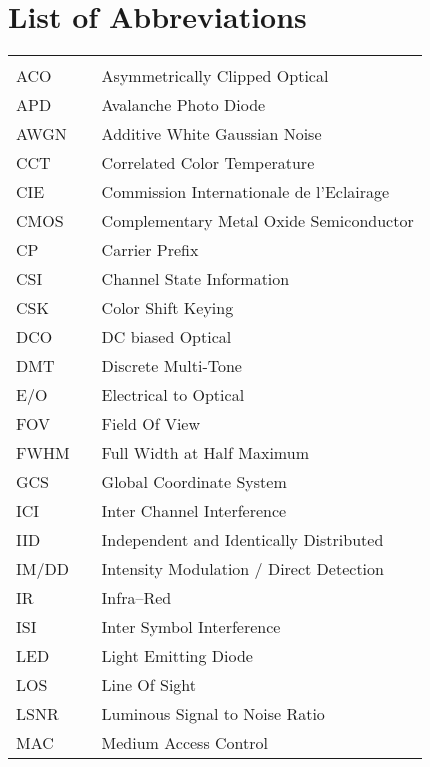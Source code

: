 \chapter*{List of Abbreviations}
\begin{center}
  \begin{longtable}{lll}
    \hspace*{2em} & \hspace*{1in} & \hspace*{4.5in} \\
    ACO & \dotfill & Asymmetrically Clipped Optical \\
		APD & \dotfill & Avalanche Photo Diode \\
		AWGN & \dotfill & Additive White Gaussian Noise \\
		CCT & \dotfill & Correlated Color Temperature \\
		CIE & \dotfill & Commission Internationale de l'Eclairage \\
		CMOS & \dotfill & Complementary Metal Oxide Semiconductor \\
		CP & \dotfill & Carrier Prefix \\
		CSI & \dotfill & Channel State Information \\
		CSK & \dotfill & Color Shift Keying \\
		DCO & \dotfill & DC biased Optical \\
		DMT & \dotfill & Discrete Multi-Tone \\
		E/O & \dotfill & Electrical to Optical \\
		FOV & \dotfill & Field Of View \\
		FWHM & \dotfill & Full Width at Half Maximum \\
		GCS & \dotfill & Global Coordinate System \\
		ICI & \dotfill & Inter Channel Interference \\
		IID & \dotfill & Independent and Identically Distributed \\
		IM/DD & \dotfill & Intensity Modulation / Direct Detection \\
		IR & \dotfill & Infra--Red \\
		ISI & \dotfill & Inter Symbol Interference \\
		LED & \dotfill & Light Emitting Diode \\
		LOS & \dotfill & Line Of Sight \\
		LSNR & \dotfill & Luminous Signal to Noise Ratio \\
		MAC & \dotfill & Medium Access Control \\

\end{longtable}
\end{center}

